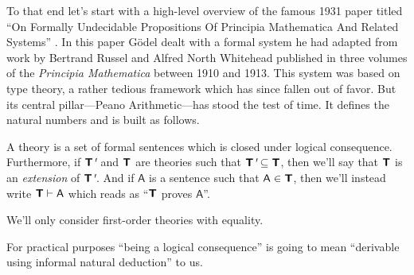 \documentclass{article}
\theoremstyle{customstyle}
\newcommand{\fm}[1]{\mathsf{#1}}
\newcommand{\fmtick}{\emph{\textquotesingle}}
\newcommand{\T}{\textbf{\textsf{T}}}
\begin{document}
To that end let's start with a high-level overview of the famous 1931 paper titled ``On Formally Undecidable Propositions Of Principia Mathematica And Related Systems'' \cite{goedel}. In this paper Gödel dealt with a formal system he had adapted from work by Bertrand Russel and Alfred North Whitehead published in three volumes of the \emph{Principia Mathematica} between 1910 and 1913. This system was based on type theory, a rather tedious framework which has since fallen out of favor. But its central pillar---Peano Arithmetic---has stood the test of time. It defines the natural numbers and is built as follows.

\begin{definition}[Theory]
  A theory is a set of formal sentences which is closed under logical consequence. Furthermore, if $\T\fmtick$ and $\T$ are theories such that $\T\fmtick \subseteq \T$, then we'll say that $\T$ is an \emph{extension} of $\T\fmtick$. And if $\fm{A}$ is a sentence such that $\fm{A} \in \T$, then we'll instead write $\T \vdash \fm{A}$ which reads as ``$\T$ proves $\fm{A}$''.

  We'll only consider first-order theories with equality.
\end{definition}

For practical purposes ``being a logical consequence'' is going to mean ``derivable using informal natural deduction'' to us.
\end{document}
